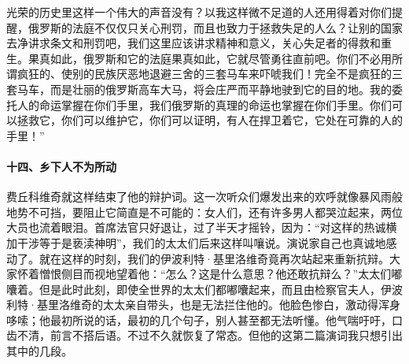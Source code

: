 光荣的历史里这样一个伟大的声音没有？以我这样微不足道的人还用得着对你们提醒，俄罗斯的法庭不仅仅只关心刑罚，而且也致力于拯救失足的人么？让别的国家去净讲求条文和刑罚吧，我们这里应该讲求精神和意义，关心失足者的得救和重生。果真如此，俄罗斯和它的法庭果真如此，它就尽管勇往直前吧。你们不必用所谓疯狂的、使别的民族厌恶地退避三舍的三套马车来吓唬我们！完全不是疯狂的三套马车，而是壮丽的俄罗斯高车大马，将会庄严而平静地驶到它的目的地。我的委托人的命运掌握在你们手里，我们俄罗斯的真理的命运也掌握在你们手里。你们可以拯救它，你们可以维护它，你们可以证明，有人在捍卫着它，它处在可靠的人的手里！”
\paragraph*{十四、乡下人不为所动}
\par 费丘科维奇就这样结束了他的辩护词。这一次听众们爆发出来的欢呼就像暴风雨般地势不可挡，要阻止它简直是不可能的：女人们，还有许多男人都哭泣起来，两位大员也流着眼泪。首席法官只好退让，过了半天才摇铃，因为：“对这样的热诚横加干涉等于是亵渎神明”，我们的太太们后来这样叫嚷说。演说家自己也真诚地感动了。就在这样的时刻，我们的伊波利特·基里洛维奇竟再次站起来重新抗辩。大家怀着憎恨侧目而视地望着他：“怎么？这是什么意思？他还敢抗辩么？”太太们嘟囔着。但是此时此刻，即使全世界的太太们都嘟囔起来，而且由检察官夫人，伊波利特·基里洛维奇的太太亲自带头，也是无法拦住他的。他脸色惨白，激动得浑身哆嗦；他最初所说的话，最初的几个句子，别人甚至都无法听懂。他气喘吁吁，口齿不清，前言不搭后语。不过不久就恢复了常态。但他的这第二篇演词我只想引出其中的几段。
